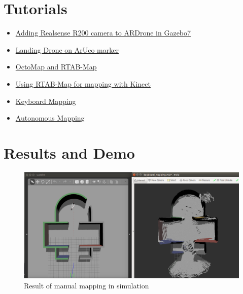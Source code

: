 \documentclass[a4paper,12pt,oneside]{book}
\begin{document}
\section{Tutorials}
\begin{itemize}
	\item \href{https://github.com/eYSIP-2017/eYSIP-2017_Indoor-Environments-Mapping-using-UAV/blob/master/Documents/Tutorials/Adding%20Realsense%20R200%20camera%20to%20ARDrone%20in%20Gazebo7.pdf}{Adding Realsense R200 camera to ARDrone in Gazebo7}
	\item \href{https://github.com/eYSIP-2017/eYSIP-2017_Indoor-Environments-Mapping-using-UAV/blob/master/Documents/Tutorials/Landing%20Drone%20on%20ArUco%20marker.pdf}{Landing Drone on ArUco marker}
	
	\item \href{https://github.com/eYSIP-2017/eYSIP-2017_Indoor-Environments-Mapping-using-UAV/blob/master/Documents/Tutorials/OctoMap%20and%20RTAB-Map.pdf}{OctoMap and RTAB-Map}
	
	\item \href{https://github.com/eYSIP-2017/eYSIP-2017_Indoor-Environments-Mapping-using-UAV/blob/master/Documents/Tutorials/Using%20RTAB-Map%20for%20mapping%20with%20Kinect.pdf}{Using RTAB-Map for mapping with Kinect}
	
	\item \href{https://github.com/eYSIP-2017/eYSIP-2017_Indoor-Environments-Mapping-using-UAV/blob/master/Documents/Tutorials/Keyboard%20Mapping.pdf}{Keyboard Mapping}
	
	\item \href{https://github.com/eYSIP-2017/eYSIP-2017_Indoor-Environments-Mapping-using-UAV/blob/master/Documents/Tutorials/Autonomous%20Mapping.pdf}{Autonomous Mapping}
	
\end{itemize}

\vspace{.5in}

\section{Results and Demo}
\begin{figure}[h]
	\centering
	\includegraphics[scale=0.28]{map}
	\caption{Result of manual mapping in simulation}
\end{figure}
\end{document}
